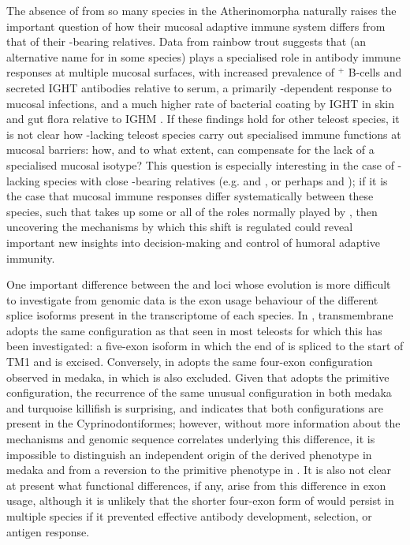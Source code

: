 The absence of  from so many species in the Atherinomorpha naturally raises the important question of how their mucosal adaptive immune system differs from that of their -bearing relatives. Data from rainbow trout suggests that  (an alternative name for  in some species) plays a specialised role in antibody immune responses at multiple mucosal surfaces, with increased prevalence of $^+$ B-cells and secreted IGHT antibodies relative to serum, a primarily -dependent response to mucosal infections, and a much higher rate of bacterial coating by IGHT in skin and gut flora relative to IGHM \parencite{zhang2010igtgut,xu2013igtskin}.
If these findings hold for other teleost species, it is not clear how -lacking teleost species carry out specialised immune functions at mucosal barriers: how, and to what extent, can  compensate for the lack of a specialised mucosal isotype? This question is especially interesting in the case of -lacking species with close -bearing relatives (e.g. \nfu and , or perhaps  and ); if it is the case that mucosal immune responses differ systematically between these species, such that  takes up some or all of the roles normally played by , then uncovering the mechanisms by which this shift is regulated could reveal important new insights into decision-making and control of humoral adaptive immunity.

One important difference between the \Xma and \Nfu loci whose evolution is more difficult to investigate from genomic data is the exon usage behaviour of the different splice isoforms present in the transcriptome of each species. In \Xma, transmembrane  adopts the same configuration as that seen in most teleosts for which this has been investigated: a five-exon isoform in which the end of  is spliced to the start of TM1 and  is excised. Conversely, in \Nfu {} adopts the same four-exon configuration observed in medaka, in which  is also excluded. Given that \Xma adopts the primitive configuration, the recurrence of the same unusual configuration in both medaka and turquoise killifish is surprising, and indicates that both configurations are present in the Cyprinodontiformes; however, without more information about the mechanisms and genomic sequence correlates underlying this difference, it is impossible to distinguish an independent origin of the derived phenotype in medaka and \Nfu from a reversion to the primitive phenotype in \Xma. It is also not clear at present what functional differences, if any, arise from this difference in exon usage, although it is unlikely that the shorter four-exon form of  would persist in multiple species if it prevented effective antibody development, selection, or antigen response.

